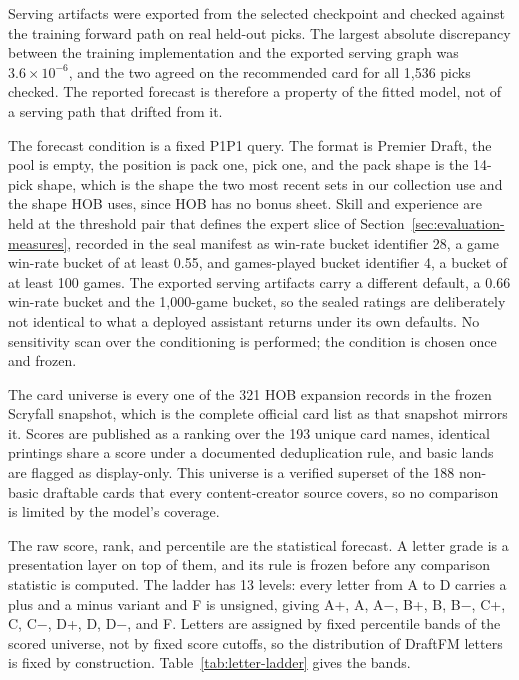 \documentclass[11pt]{article}
\numberwithin{equation}{section}
\begin{document}
Serving artifacts were exported from the selected checkpoint and checked against
the training forward path on real held-out picks. The largest absolute
discrepancy between the training implementation and the exported serving graph
was $3.6\times10^{-6}$, and the two agreed on the recommended card for all 1,536
picks checked. The reported forecast is therefore a property of the fitted
model, not of a serving path that drifted from it.

The forecast condition is a fixed P1P1 query. The format is Premier Draft, the
pool is empty, the position is pack one, pick one, and the pack shape is the
14-pick shape, which is the shape the two most recent sets in our collection use
and the shape HOB uses, since HOB has no bonus sheet. Skill and experience are
held at the threshold pair that defines the expert slice of
Section~\ref{sec:evaluation-measures}, recorded in the seal manifest as win-rate
bucket identifier 28, a game win-rate bucket of at least 0.55, and games-played
bucket identifier 4, a bucket of at least 100 games. The exported serving
artifacts carry a different default, a 0.66 win-rate bucket and the 1{,}000-game
bucket, so the sealed ratings are deliberately not identical to what a deployed
assistant returns under its own defaults. No sensitivity scan over the
conditioning is performed; the condition is chosen once and frozen.

The card universe is every one of the 321 HOB expansion records in the frozen
Scryfall snapshot, which is the complete official card list as that snapshot
mirrors it. Scores are published as a ranking over the 193 unique card names,
identical printings share a score under a documented deduplication rule, and
basic lands are flagged as display-only. This universe is a verified superset of
the 188 non-basic draftable cards that every content-creator source covers, so
no comparison is limited by the model's coverage.

The raw score, rank, and percentile are the statistical forecast. A letter grade
is a presentation layer on top of them, and its rule is frozen before any
comparison statistic is computed. The ladder has 13 levels: every letter from A
to D carries a plus and a minus variant and F is unsigned, giving A+, A, A$-$,
B+, B, B$-$, C+, C, C$-$, D+, D, D$-$, and F. Letters are assigned by fixed
percentile bands of the scored universe, not by fixed score cutoffs, so the
distribution of DraftFM letters is fixed by construction.
Table~\ref{tab:letter-ladder} gives the bands.
\end{document}
